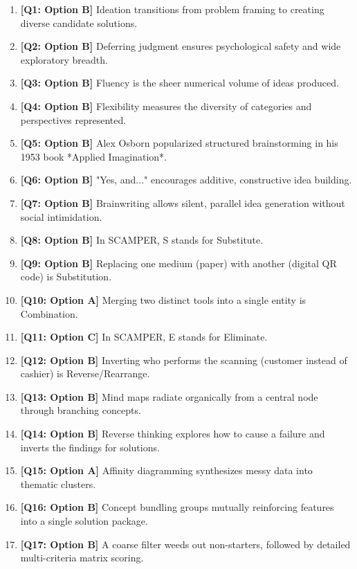 \begin{expbox}
\begin{enumerate}[leftmargin=6mm, itemsep=2.5mm]
  \item \textbf{[Q1: Option B]} Ideation transitions from problem framing to creating diverse candidate solutions.
  \item \textbf{[Q2: Option B]} Deferring judgment ensures psychological safety and wide exploratory breadth.
  \item \textbf{[Q3: Option B]} Fluency is the sheer numerical volume of ideas produced.
  \item \textbf{[Q4: Option B]} Flexibility measures the diversity of categories and perspectives represented.
  \item \textbf{[Q5: Option B]} Alex Osborn popularized structured brainstorming in his 1953 book *Applied Imagination*.
  \item \textbf{[Q6: Option B]} "Yes, and..." encourages additive, constructive idea building.
  \item \textbf{[Q7: Option B]} Brainwriting allows silent, parallel idea generation without social intimidation.
  \item \textbf{[Q8: Option B]} In SCAMPER, S stands for Substitute.
  \item \textbf{[Q9: Option B]} Replacing one medium (paper) with another (digital QR code) is Substitution.
  \item \textbf{[Q10: Option A]} Merging two distinct tools into a single entity is Combination.
  \item \textbf{[Q11: Option C]} In SCAMPER, E stands for Eliminate.
  \item \textbf{[Q12: Option B]} Inverting who performs the scanning (customer instead of cashier) is Reverse/Rearrange.
  \item \textbf{[Q13: Option B]} Mind maps radiate organically from a central node through branching concepts.
  \item \textbf{[Q14: Option B]} Reverse thinking explores how to cause a failure and inverts the findings for solutions.
  \item \textbf{[Q15: Option A]} Affinity diagramming synthesizes messy data into thematic clusters.
  \item \textbf{[Q16: Option B]} Concept bundling groups mutually reinforcing features into a single solution package.
  \item \textbf{[Q17: Option B]} A coarse filter weeds out non-starters, followed by detailed multi-criteria matrix scoring.

\end{enumerate}
\end{expbox}
